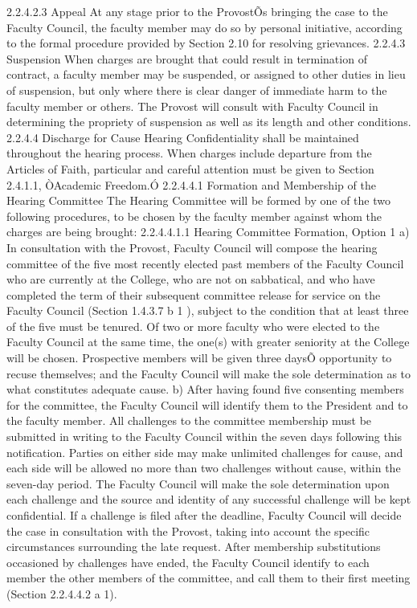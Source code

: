 \documentclass[letterpaper, 11pt]{article}
\begin{document}
2.2.4.2.3 Appeal
   At any stage prior to the ProvostÕs bringing the case to the Faculty Council, the faculty member may do so by personal initiative, according to the formal procedure provided by Section 2.10 for resolving grievances.
2.2.4.3 Suspension
   When charges are brought that could result in termination of contract, a faculty member may be suspended, or assigned to other duties in lieu of suspension, but only where there is clear danger of immediate harm to the faculty member or others.  The Provost will consult with Faculty Council in determining the propriety of suspension as well as its length and other conditions. 
2.2.4.4 Discharge for Cause Hearing
   Confidentiality shall be maintained throughout the hearing process.  When charges include departure from the Articles of Faith, particular and careful attention must be given to Section 2.4.1.1, ÒAcademic Freedom.Ó
2.2.4.4.1 Formation and Membership of the Hearing Committee
   The Hearing Committee will be formed by one of the two following procedures, to be chosen by the faculty member against whom the charges are being brought:
2.2.4.4.1.1 Hearing Committee Formation, Option 1
a) In consultation with the Provost, Faculty Council will compose the hearing committee of the five most recently elected past members of the Faculty Council who are currently at the College, who are not on sabbatical, and who have completed the term of their subsequent committee release for service on the Faculty Council (Section 1.4.3.7 b 1 ), subject to the condition that at least three of the five must be tenured.  Of two or more faculty who were elected to the Faculty Council at the same time, the one(s) with greater seniority at the College will be chosen.  Prospective members will be given three daysÕ opportunity to recuse themselves; and the Faculty Council will make the sole determination as to what constitutes adequate cause.
b) After having found five consenting members for the committee, the Faculty Council will identify them to the President and to the faculty member.  All challenges to the committee membership must be submitted in writing to the Faculty Council within the seven days following this notification.  Parties on either side may make unlimited challenges for cause, and each side will be allowed no more than two challenges without cause, within the seven-day period.  The Faculty Council will make the sole determination upon each challenge and the source and identity of any successful challenge will be kept confidential.  If a challenge is filed after the deadline, Faculty Council will decide the case in consultation with the Provost, taking into account the specific circumstances surrounding the late request.  After membership substitutions occasioned by challenges have ended, the Faculty Council identify to each member the other members of the committee, and call them to their first meeting (Section 2.2.4.4.2 a 1).
\end{document}
